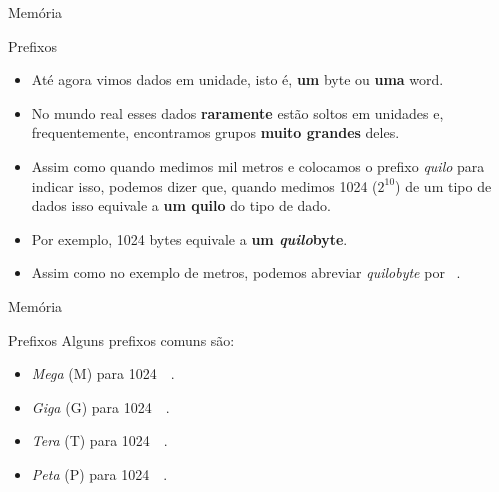 \begin{frame}{Memória}
	\begin{block}{Prefixos}
		\begin{itemize}
			\item Até agora vimos dados em unidade, isto é, \textbf{um} byte ou \textbf{uma} word.
			\item No mundo real esses dados \textbf{raramente} estão soltos em unidades e, frequentemente, encontramos grupos \textbf{muito grandes} deles.
			\item Assim como quando medimos mil metros e colocamos o prefixo \textit{quilo} para indicar isso, podemos dizer que, quando medimos 1024 ($ 2^{10} $) de um tipo de dados isso equivale a \textbf{um quilo} do tipo de dado.
			\item Por exemplo, 1024 bytes equivale a \textbf{um \textit{quilo}byte}.
			\item Assim como no exemplo de metros, podemos abreviar \textit{quilobyte} por \si{\kilo\byte}.
		\end{itemize}
	\end{block}
\end{frame}


\begin{frame}{Memória}
	\begin{block}{Prefixos}
		Alguns prefixos comuns são:
		\begin{itemize}
			\item \textit{Mega} (M) para \SI{1024}{\kilo\byte}.
			\item \textit{Giga} (G) para \SI{1024}{\mega\byte}.
			\item \textit{Tera} (T) para \SI{1024}{\giga\byte}.
			\item \textit{Peta} (P) para \SI{1024}{\tera\byte}.
		\end{itemize}
	\end{block}
\end{frame}



